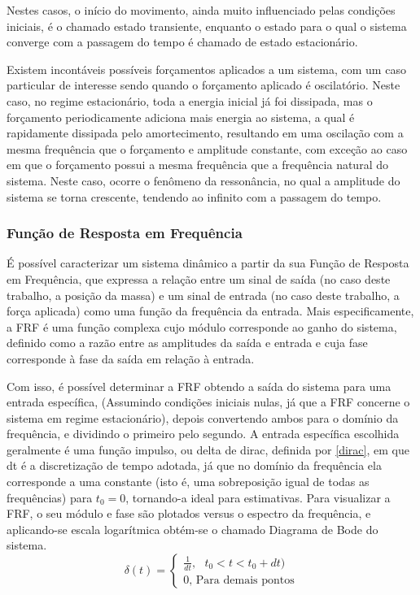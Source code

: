 \documentclass[12pt,a4paper]{article}
\begin{document}
\par Nestes casos, o início do movimento, ainda muito influenciado pelas condições iniciais, é o chamado estado transiente, enquanto o estado para o qual o sistema converge com a passagem do tempo é chamado de estado estacionário.

\par Existem incontáveis possíveis forçamentos aplicados a um sistema, com um caso particular de interesse sendo quando o forçamento aplicado é oscilatório. Neste caso, no regime estacionário, toda a energia inicial já foi dissipada, mas o forçamento periodicamente adiciona mais energia ao sistema, a qual é rapidamente dissipada pelo amortecimento, resultando em uma oscilação com a mesma frequência que o forçamento e amplitude constante, com exceção ao caso em que o forçamento possui a mesma frequência que a frequência natural do sistema. Neste caso, ocorre o fenômeno da ressonância, no qual a amplitude do sistema se torna crescente, tendendo ao infinito com a passagem do tempo.

\subsubsection{Função de Resposta em Frequência}
\par É possível caracterizar um sistema dinâmico a partir da sua Função de Resposta em Frequência, que expressa a relação entre um sinal de saída (no caso deste trabalho, a posição da massa) e um sinal de entrada (no caso deste trabalho, a força aplicada) como uma função da frequência da entrada. Mais especificamente, a FRF é uma função complexa cujo módulo corresponde ao ganho do sistema, definido como a razão entre as amplitudes da saída e entrada e cuja fase corresponde à fase da saída em relação à entrada.
\par Com isso, é possível determinar a FRF obtendo a saída do sistema para uma entrada específica, (Assumindo condições iniciais nulas, já que a FRF concerne o sistema em regime estacionário), depois convertendo ambos para o domínio da frequência, e dividindo o primeiro pelo segundo. A entrada específica escolhida geralmente é uma função impulso, ou delta de dirac, definida por \eqref{dirac}, em que dt é a discretização de tempo adotada, já que no domínio da frequência ela corresponde a uma constante (isto é, uma sobreposição igual de todas as frequências) para $t_0 = 0$, tornando-a ideal para estimativas. Para visualizar a FRF, o seu módulo e fase são plotados versus o espectro da frequência, e aplicando-se escala logarítmica obtém-se o chamado Diagrama de Bode do sistema.
\begin{equation}
    \label{dirac}
    \delta(t) = \begin{cases}
        \frac{1}{dt},\text{ } t_0 < t < t_0 + dt)\\
        0\text{, Para demais pontos}
    \end{cases}
\end{equation}
\end{document}
